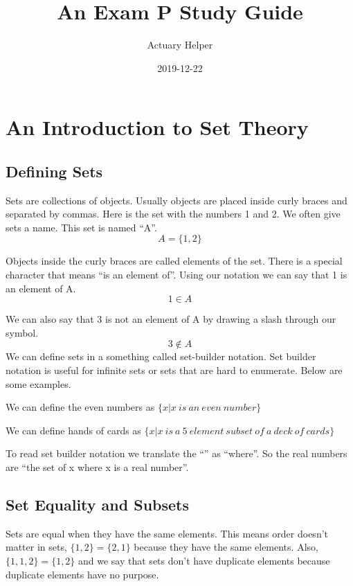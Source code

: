 \documentclass[]{book}
\title{An Exam P Study Guide}
\author{Actuary Helper}
\date{2019-12-22}
\begin{document}
\maketitle

{
\setcounter{tocdepth}{1}
\tableofcontents
}
\chapter{An Introduction to Set
Theory}\label{an-introduction-to-set-theory}

\section{Defining Sets}\label{defining-sets}

Sets are collections of objects. Usually objects are placed inside curly
braces and separated by commas. Here is the set with the numbers 1 and
2. We often give sets a name. This set is named ``A''. \[A=\{1,2\}\]

Objects inside the curly braces are called elements of the set. There is
a special character that means ``is an element of''. Using our notation
we can say that 1 is an element of A. \[1 \in A\]

We can also say that 3 is not an element of A by drawing a slash through
our symbol. \[3 \not\in A\] We can define sets in a something called
set-builder notation. Set builder notation is useful for infinite sets
or sets that are hard to enumerate. Below are some examples.

We can define the even numbers as
\(\{x | x \ is \  an \  even \ number\}\)

We can define hands of cards as
\(\{x | x \ is \  a \ 5 \ element \ subset \ of \ a \ deck \ of \ cards\}\)

To read set builder notation we translate the ``\textbar{}'' as
``where''. So the real numbers are ``the set of x where x is a real
number''.

\section{Set Equality and Subsets}\label{set-equality-and-subsets}

Sets are equal when they have the same elements. This means order
doesn't matter in sets, \(\{1,2\} = \{2,1\}\) because they have the same
elements. Also, \(\{1,1,2\} = \{1,2\}\) and we say that sets don't have
duplicate elements because duplicate elements have no purpose.
\end{document}
